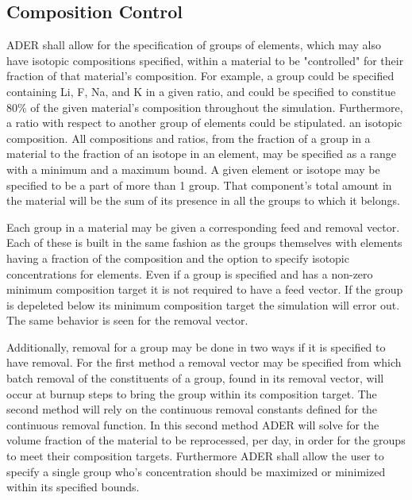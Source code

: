 \documentclass[12pt]{article}
\begin{document}
\subsection{Composition Control}
ADER shall allow for the specification of groups of elements, which may also
have isotopic compositions specified, within a material
to be "controlled" for their fraction of that material's composition. For
example, a group could be specified containing Li, F, Na, and K in a given
ratio, and could
be specified to constitue 80\% of the given material's composition
throughout the simulation. Furthermore, a ratio with respect to another group
of elements could be stipulated. 
an isotopic composition. All compositions and ratios, from the fraction of a
 group in a material to the fraction of an isotope in an element,
may be specified as a range with a minimum
and a maximum bound. A given element or isotope may be specified to be a part
of more than 1 group. That component's total amount in the material will be
the sum of its presence in all the groups to which it belongs. \par
Each group in a material may be given a corresponding feed and removal
vector. Each of these is built in the same fashion as the groups themselves
with elements having a fraction of the composition and the option to specify
isotopic concentrations for elements. Even if a group is specified and has a
non-zero minimum composition target it is not required to have a feed vector.
If the group is depeleted below its minimum composition target the simulation
will error out. The same behavior is seen for the removal vector. \par
 Additionally,
removal for a group may be done in two ways if it is specified to have removal.
For the first method a removal vector may be specified from which batch
removal of the
constituents of a group, found in its removal vector, will occur at burnup 
steps to bring the group within its composition target. The second method
will rely on the continuous removal constants defined for the continuous
removal function. In this second method ADER will solve for the volume fraction
of the material to be reprocessed, per day, in order for the groups to meet
their composition targets.
Furthermore ADER shall allow the user to specify a single group who's
concentration should be maximized or minimized within its specified bounds.
\end{document}
